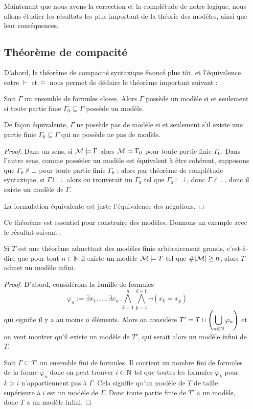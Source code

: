 Maintenant que nous avons la correction et la complétude de notre logique, nous allons étudier les résultats les plus important de la théorie des modèles, ainsi que leur conséquences. 

\subsection{Théorème de compacité}

D'abord, le théorème de compacité syntaxique énoncé plus tôt, et l'équivalence entre $\vdash$ et $\vDash$ nous permet de déduire le théorème important suivant :

\begin{them}
    Soit $\Gamma$ un ensemble de formules closes. Alors $\Gamma$ possède un modèle si et seulement si toute partie finie $\Gamma_0\subseteq\Gamma$ possède un modèle.

    De façon équivalente, $\Gamma$ ne possède pas de modèle si et seulement s'il existe une partie finie $\Gamma_0\subseteq\Gamma$ qui ne possède ne pas de modèle.
\end{them}

\begin{proof}
    Dans un sens, si $\mathcal M\models \Gamma$ alors $\mathcal M\models\Gamma_0$ pour toute partie finie $\Gamma_0$. Dans l'autre sens, comme posséder un modèle est équivalent à être cohérent, supposons que $\Gamma_0\nvdash \bot$ pour toute partie finie $\Gamma_0$ : alors par théorème de complétude syntaxique, si $\Gamma\vdash\bot$ alors on trouverait un $\Gamma_0$ tel que $\Gamma_0\vdash\bot$, donc $\Gamma\nvdash\bot$, donc il existe un modèle de $\Gamma$.

    La formulation équivalente est juste l'équivalence des négations.
\end{proof}

Ce théorème est essentiel pour construire des modèles. Donnons un exemple avec le résultat suivant :

\begin{prop}
    Si $T$ est une théorème admettant des modèles finis arbitrairement grands, c'est-à-dire que pour tout $n\in\mathbb N$ il existe un modèle $\mathcal M\models T$ tel que $\# |\mathcal M| \geq n$, alors $T$ admet un modèle infini.
\end{prop}

\begin{proof}
    D'abord,  considérons la famille de formules $$\varphi_n := \exists x_1,\ldots,\exists x_n.\bigwedge_{k=1}^n \bigwedge_{p=1}^{k-1} \lnot(x_k=x_p)$$ qui signifie \og il y a au moins $n$ éléments\fg{}. Alors on considère $T' = T \cup \displaystyle{\left(\bigcup_{n\in\mathbb{N}}\varphi_n\right)}$ et on veut montrer qu'il existe un modèle de $T'$, qui serait alors un modèle infini de $T$.

    Soit $\Gamma\subseteq T'$ un ensemble fini de formules. Il contient un nombre fini de formules de la forme $\varphi_n$ donc on peut trouver $i\in\mathbb{N}$ tel que toutes les formules $\varphi_k$ pour $k> i$ n'appartiennent pas à $\Gamma$. Cela signifie qu'un modèle de $T$ de taille supérieure à $i$ est un modèle de $\Gamma$. Donc toute partie finie de $T'$ a un modèle, donc $T$ a un modèle infini.
\end{proof}

